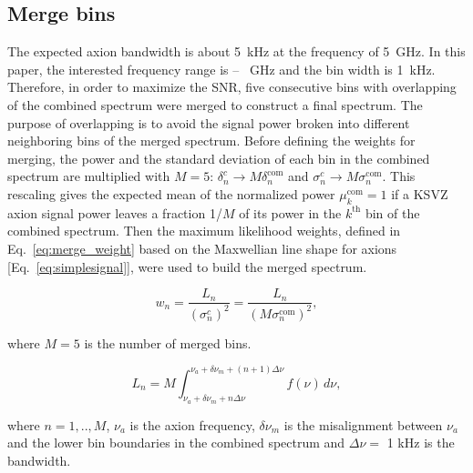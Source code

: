 \subsection{Merge bins}
\label{sec:merge}

The expected axion bandwidth is about 5~kHz at the frequency of 5~GHz. In 
this paper, the interested frequency range is \flo -- \fhi~GHz and the bin 
width is 1~kHz. Therefore, in order to maximize the SNR, five consecutive 
bins with overlapping of the combined spectrum were merged to construct a 
final spectrum.
The purpose of overlapping is to avoid the signal power broken into different 
neighboring bins of the merged spectrum. Before defining the weights for 
merging, 
the power and the standard deviation of each bin in the combined spectrum are 
multiplied with $M=5$: $\delta^{c}_n \rightarrow M\delta^\text{com}_n$ and 
$\sigma^{c}_n \rightarrow M \sigma^\text{com}_n$. This rescaling gives the 
expected mean of the normalized power $\mu^\text{com}_k = 1$ if a KSVZ axion 
signal power leaves a fraction 1/$M$ of its power in the $k^\text{th}$ 
bin of the combined spectrum.
Then the maximum likelihood weights, defined in Eq.~\eqref{eq:merge_weight} based on the Maxwellian line shape for axions [Eq.~\eqref{eq:simplesignal}], 
were used to build the merged spectrum. 



\begin{equation}
    \label{eq:merge_weight}
    w_{n} = \frac{L_{n}}{(\sigma_{n}^{c})^{2}} = \frac{L_{n}}{(M\sigma_{n}^\text{com})^{2}},
\end{equation}

where $M = 5$ is the number of merged bins.


\begin{equation}
    \label{eq:Lq_integtal}
    L_{n} = M \int_{\nu_a +\delta\nu_m + n\Delta\nu}^{\nu_a +\delta\nu_m + (n+1)\Delta\nu} f(\nu) \,d\nu,
\end{equation}


where $n = 1,..,M$, $\nu_a$ is the axion frequency, $\delta\nu_m$ is the misalignment between $\nu_a$ and the lower bin boundaries
in the combined spectrum and $\Delta\nu =$ 1 kHz is the bandwidth.

